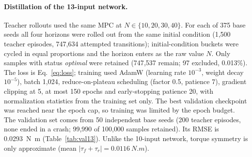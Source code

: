 \documentclass[preprint,12pt,authoryear=false]{elsarticle}
\theoremstyle{remark}\newtheorem{remark}{Remark}
\theoremstyle{plain}\newtheorem{proposition}{Proposition}\newtheorem{lemma}{Lemma}
\theoremstyle{definition}\newtheorem{assumption}{Assumption}
\begin{document}
\begin{table}[t]\centering\small
\caption{Paired healthy-plant closed-loop comparison of the teacher MPC and the distilled 10-input neural MPC (100 seeds per condition). Time is the mean command-computation time; Median/P95/Max are episode-level statistics (median of 100 episode means, mean of per-episode 95th percentiles, maximum over all steps).}\label{tab:cl}
\end{table}

\paragraph{Distillation of the 13-input network.}
Teacher rollouts used the same MPC at $N\in\{10,20,30,40\}$. For each of 375 base seeds all four horizons were rolled out from the same initial condition (1{,}500 teacher episodes, 747{,}634 attempted transitions); initial-condition buckets were cycled in equal proportions and the horizon enters as the raw value $N$. Only samples with status \emph{optimal} were retained (747{,}537 remain; 97 excluded, 0.013\%). The loss is Eq.~\eqref{eq:loss}; training used AdamW (learning rate $10^{-3}$, weight decay $10^{-5}$), batch 1{,}024, reduce-on-plateau scheduling (factor 0.5, patience 7), gradient clipping at 5, at most 150 epochs and early-stopping patience 20, with normalization statistics from the training set only. The best validation checkpoint was reached near the epoch cap, so training was limited by the epoch budget. The validation set comes from 50 independent base seeds (200 teacher episodes, none ended in a crash; 99{,}990 of 100{,}000 samples retained). Its RMSE is \SI{0.0293}{N.m} (Table~\ref{tab:val13}). Unlike the 10-input network, torque symmetry is only approximate (mean $|\tau_f+\tau_r|=\SI{0.0116}{N.m}$).
\end{document}
